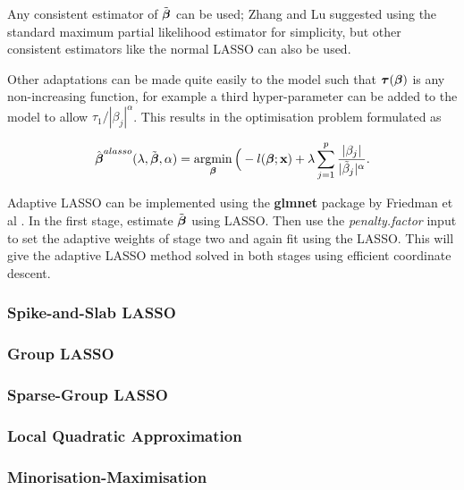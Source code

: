 Any consistent estimator of $\Tilde{\boldsymbol{\beta}}$ can be used; Zhang and Lu  suggested using the standard maximum partial likelihood estimator for simplicity, but other consistent estimators like the normal LASSO can also be used.

Other adaptations can be made quite easily to the model such that $\boldsymbol{\tau}(\boldsymbol{\beta})$ is any non-increasing function, for example a third hyper-parameter can be added to the model to allow $\tau_1/|\beta_j|^\alpha$. This results in the optimisation problem formulated as 

\begin{equation}\label{eqn:adaptive-lasso-triple}
    \hat{\boldsymbol{\beta}}^{alasso}(\lambda,\Tilde{\boldsymbol{\beta}},\alpha)=\operatorname*{argmin}_{\boldsymbol{\beta}}\Big(-l(\boldsymbol{\beta};\textbf{x})+\lambda\sum_{j=1}^p\frac{|\beta_j|}{|\Tilde{\beta}_j|^\alpha}.
\end{equation}

Adaptive LASSO can be implemented using the \textbf{glmnet} package by Friedman et al . In the first stage, estimate $\Tilde{\boldsymbol{\beta}}$ using LASSO. Then use the \emph{penalty.factor} input to set the adaptive weights of stage two and again fit using the LASSO. This will give the adaptive LASSO method solved in both stages using efficient coordinate descent.

\iffalse
\subsubsection{Adaptive Elastic Net}
\fi

\subsubsection{Spike-and-Slab LASSO}
\subsubsection{Group LASSO}

\subsubsection{Sparse-Group LASSO}

\subsubsection{Local Quadratic Approximation}
\subsubsection{Minorisation-Maximisation}
